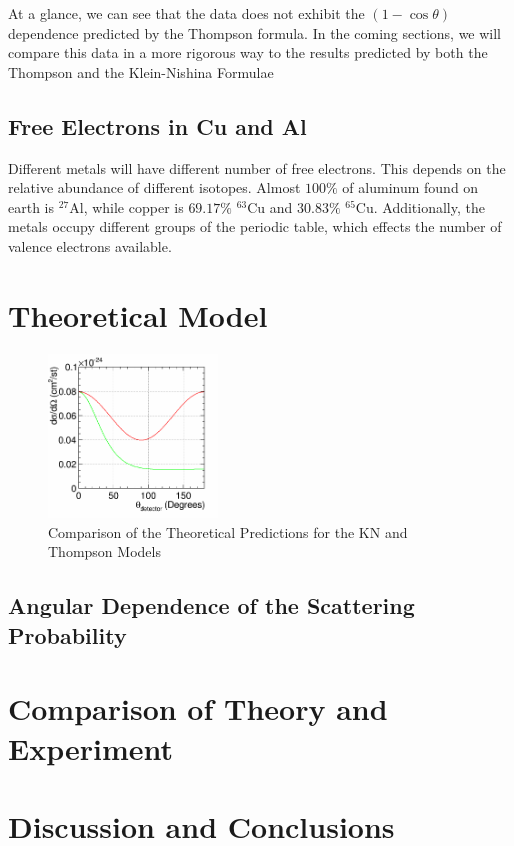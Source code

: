 \documentclass[%
 reprint,
 amsmath,amssymb,
 aps,
 pra,
]{revtex4-1}
\begin{document}
\noindent At a glance, we can see that the data does not exhibit the $(1 - \cos{\theta})$ dependence predicted by the Thompson formula. In the coming sections, we will compare this data in a more rigorous way to the results predicted by both the Thompson and the Klein-Nishina Formulae

\subsection{Free Electrons in Cu and Al}

Different metals will have different number of free electrons. This depends on the relative abundance of different isotopes. Almost $100\%$ of aluminum found on earth is $^{27}$Al, while copper is $69.17 \%$ $^{63}$Cu and $30.83 \%$ $^{65}$Cu. Additionally, the metals occupy different groups of the periodic table, which effects the number of valence electrons available.

\section{Theoretical Model}

\begin{figure}[H]
	\centering
	\includegraphics[width=0.4\textwidth]{KNvsThompson_TheoryOnly.png}
	\caption{Comparison of the Theoretical Predictions for the KN and Thompson Models}
	\label{KN_vs_Thompson_Theory}
\end{figure}

\subsection{Angular Dependence of the Scattering Probability}

\section{Comparison of Theory and Experiment}

\section{Discussion and Conclusions}
\end{document}
